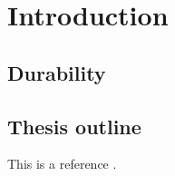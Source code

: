 \chapter{Introduction}

\section{Durability}

\section{Thesis outline}

This is a reference \citep{example-ref2015}.